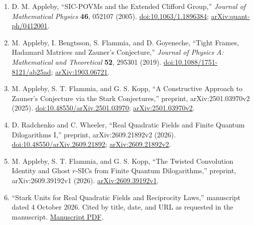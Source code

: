 \begin{enumerate}[label={},leftmargin=4.8em,labelsep=0.5em]
  \footnotesize
  \item[\textup{[App05]}]\label{ref:p19-appleby-clifford}
  D. M. Appleby, ``SIC-POVMs and the Extended Clifford Group,''
  \emph{Journal of Mathematical Physics} \textbf{46}, 052107 (2005).
  \href{https://doi.org/10.1063/1.1896384}{doi:10.1063/1.1896384};
  \href{https://arxiv.org/abs/quant-ph/0412001}{arXiv:quant-ph/0412001}.

  \item[\textup{[ABFG19]}]\label{ref:p19-appleby-data}
  M. Appleby, I. Bengtsson, S. Flammia, and D. Goyeneche,
  ``Tight Frames, Hadamard Matrices and Zauner's Conjecture,''
  \emph{Journal of Physics A: Mathematical and Theoretical} \textbf{52},
  295301 (2019).
  \href{https://doi.org/10.1088/1751-8121/ab25ad}{doi:10.1088/1751-8121/ab25ad};
  \href{https://arxiv.org/abs/1903.06721}{arXiv:1903.06721}.

  \item[\textup{[AFK25]}]\label{ref:p19-appleby-stark}
  M. Appleby, S. T. Flammia, and G. S. Kopp,
  ``A Constructive Approach to Zauner's Conjecture via the Stark
  Conjectures,'' preprint, arXiv:2501.03970v2 (2025).
  \href{https://doi.org/10.48550/arXiv.2501.03970}{doi:10.48550/arXiv.2501.03970};
  \href{https://arxiv.org/abs/2501.03970v2}{arXiv:2501.03970v2}.

  \item[\textup{[RW26]}]\label{ref:p19-radchenko-wheeler}
  D. Radchenko and C. Wheeler,
  ``Real Quadratic Fields and Finite Quantum Dilogarithms I,''
  preprint, arXiv:2609.21892v2 (2026).
  \href{https://doi.org/10.48550/arXiv.2609.21892}{doi:10.48550/arXiv.2609.21892};
  \href{https://arxiv.org/abs/2609.21892v2}{arXiv:2609.21892v2}.

  \item[\textup{[AFK26]}]\label{ref:p19-twisted-convolution}
  M. Appleby, S. T. Flammia, and G. S. Kopp,
  ``The Twisted Convolution Identity and Ghost $r$-SICs from Finite
  Quantum Dilogarithms,'' preprint, arXiv:2609.39192v1 (2026).
  \href{https://arxiv.org/abs/2609.39192v1}{arXiv:2609.39192v1}.

  \item[\textup{[SU26]}]\label{ref:p19-stark-reciprocity}
  ``Stark Units for Real Quadratic Fields and Reciprocity Laws,''
  manuscript dated 4 October 2026. Cited by title, date, and URL as requested
  in the manuscript.
  \href{https://www.danrad.net/papers/stark-reciprocity.pdf}{Manuscript PDF}.
\end{enumerate}

